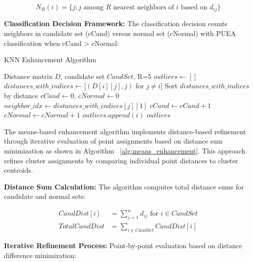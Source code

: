 \begin{equation}
N_R(i) = \{j : j \text{ among } R \text{ nearest neighbors of } i \text{ based on } d_{ij}\}
\end{equation}

\textbf{Classification Decision Framework:}
The classification decision counts neighbors in candidate set (cCand) versus normal set (cNormal) with PUEA classification when cCand > cNormal:

\begin{algorithm}
\caption{KNN Enhancement Algorithm}
\label{alg:knn_en_algo}
\begin{algorithmic}[1]
\REQUIRE Distance matrix $D$, candidate set $CandSet$, R=5
\STATE $outliers \leftarrow []$
    \STATE $distances\_with\_indices \leftarrow [(D[i][j], j)$ for $j \neq i]$
    \STATE Sort $distances\_with\_indices$ by distance
    \STATE $cCand \leftarrow 0$, $cNormal \leftarrow 0$
        \STATE $neighbor\_idx \leftarrow distances\_with\_indices[j][1]$
            \STATE $cCand \leftarrow cCand + 1$
        \ELSE
            \STATE $cNormal \leftarrow cNormal + 1$
        \ENDIF
    \ENDFOR
        \STATE $outliers.append(i)$
    \ENDIF
\ENDFOR
\RETURN $outliers$
\end{algorithmic}
\end{algorithm}

The means-based enhancement algorithm implements distance-based refinement through iterative evaluation of point assignments based on distance sum minimization as shown in Algorithm ~\ref{alg:means_enhancement}. This approach refines cluster assignments by comparing individual point distances to cluster centroids.

\textbf{Distance Sum Calculation:}
The algorithm computes total distance sums for candidate and normal sets:

\begin{align}
CandDist[i] &= \sum_{j=1}^{n} d_{ij} \text{ for } i \in CandSet \\
TotalCandDist &= \sum_{i \in CandSet} CandDist[i]
\end{align}

\textbf{Iterative Refinement Process:}
Point-by-point evaluation based on distance difference minimization:

